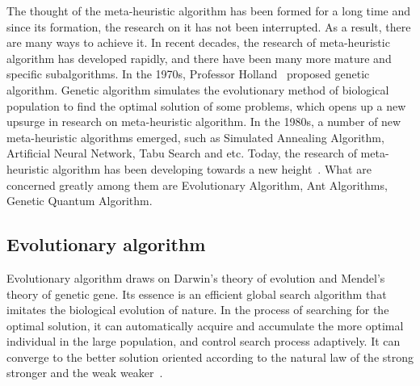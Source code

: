 The thought of the meta-heuristic algorithm has been formed for a long time 
and since its formation, the research on it has not been interrupted. As a 
result, there are many ways to achieve it. In recent decades, the research of 
meta-heuristic algorithm has developed rapidly, and there have been many more 
mature and specific subalgorithms. In the 1970s, Professor Holland~\cite{holland} 
proposed genetic algorithm. Genetic algorithm simulates the 
evolutionary method of biological population to find the optimal solution of 
some problems, which opens up a new upsurge in research on meta-heuristic 
algorithm. In the 1980s, a number of new meta-heuristic algorithms emerged, 
such as Simulated Annealing Algorithm, Artificial Neural Network, Tabu Search 
and etc. Today, the research of meta-heuristic algorithm has been developing 
towards a new height~\cite{harman}. What are concerned greatly among them are 
Evolutionary Algorithm, Ant Algorithms, Genetic Quantum Algorithm.




\subsection{Evolutionary algorithm}

Evolutionary algorithm draws on Darwin's theory of evolution and Mendel's 
theory of genetic gene. Its essence is an efficient global search algorithm 
that imitates the biological evolution of nature. In the process of searching 
for the optimal solution, it can automatically acquire and accumulate the 
more optimal individual in the large population, and control search process 
adaptively. It can converge to the better solution oriented according to the 
natural law of the strong stronger and the weak weaker~\cite{deb}.


